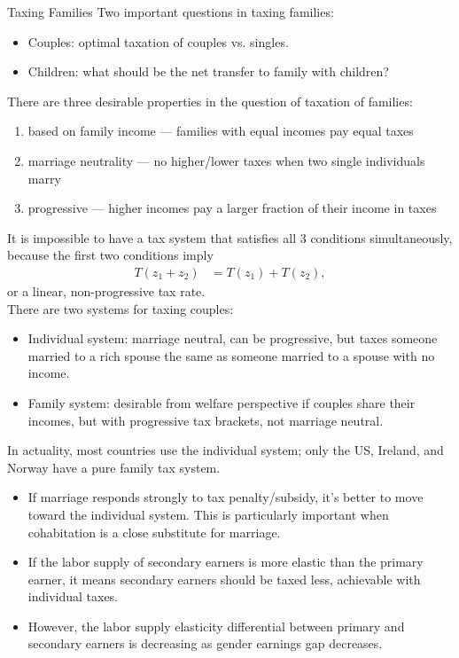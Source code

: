 \documentclass[10pt]{extarticle}
\begin{document}
  \begin{problem}{Taxing Families}
    Two important questions in taxing families:
    \begin{itemize}
      \item Couples: optimal taxation of couples vs. singles.
      \item Children: what should be the net transfer to family with children?
    \end{itemize}
    There are three desirable properties in the question of taxation of families:
    \begin{enumerate}[(1)]
      \item based on family income --- families with equal incomes pay equal taxes
      \item marriage neutrality --- no higher/lower taxes when two single individuals marry
      \item progressive --- higher incomes pay a larger fraction of their income in taxes
    \end{enumerate}
    It is impossible to have a tax system that satisfies all $3$ conditions simultaneously, because the first two conditions imply
    \begin{align*}
      T(z_1 + z_2)&= T(z_1) + T(z_2),
    \end{align*}
    or a linear, non-progressive tax rate.\\

    There are two systems for taxing couples:
    \begin{itemize}
      \item Individual system: marriage neutral, can be progressive, but taxes someone married to a rich spouse the same as someone married to a spouse with no income.
      \item Family system: desirable from welfare perspective if couples share their incomes, but with progressive tax brackets, not marriage neutral.
    \end{itemize}
    In actuality, most countries use the individual system; only the US, Ireland, and Norway have a pure family tax system.
    \begin{itemize}
      \item If marriage responds strongly to tax penalty/subsidy, it's better to move toward the individual system. This is particularly important when cohabitation is a close substitute for marriage.
      \item If the labor supply of secondary earners is more elastic than the primary earner, it means secondary earners should be taxed less, achievable with individual taxes.
      \item However, the labor supply elasticity differential between primary and secondary earners is decreasing as gender earnings gap decreases.
    \end{itemize}
  \end{problem}
\end{document}
